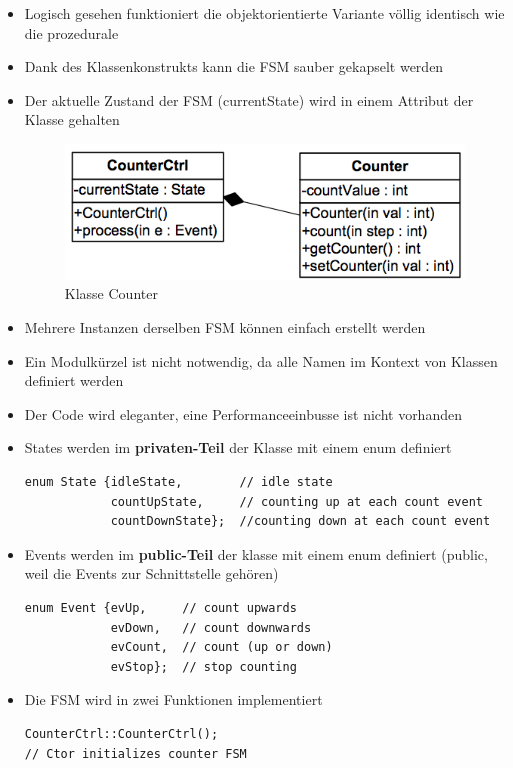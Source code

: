 \begin{itemize}
  \item Logisch gesehen funktioniert die objektorientierte Variante völlig
  identisch wie die prozedurale
  \item Dank des Klassenkonstrukts kann die FSM sauber gekapselt werden
  \item Der aktuelle Zustand der FSM (currentState) wird in einem Attribut der
  Klasse gehalten
  \begin{figure}[h]
    \centering
    {\includegraphics[scale = 0.5]{images/FSM/klasseCounter}  
    \caption{Klasse Counter}
    \label{fig:klasseCounter}}
  \end{figure}
  \item Mehrere Instanzen derselben FSM können einfach erstellt werden
  \item Ein Modulkürzel ist nicht notwendig, da alle Namen im Kontext von
  Klassen definiert werden
  \item Der Code wird eleganter, eine Performanceeinbusse ist nicht vorhanden
  \item States werden im \textbf{privaten-Teil} der Klasse mit einem enum
  definiert
\begin{lstlisting}[style=Cpp]
enum State {idleState,        // idle state 
            countUpState,     // counting up at each count event 
            countDownState};  //counting down at each count event
\end{lstlisting}
\item Events werden im \textbf{public-Teil} der klasse mit einem enum definiert
(public, weil die Events zur Schnittstelle gehören)
\begin{lstlisting}[style=Cpp]
enum Event {evUp,     // count upwards
            evDown,   // count downwards 
            evCount,  // count (up or down)
            evStop};  // stop counting
\end{lstlisting}
\item Die FSM wird in zwei Funktionen implementiert
\begin{lstlisting}[style=Cpp]
CounterCtrl::CounterCtrl(); 
// Ctor initializes counter FSM


\end{lstlisting}
\end{itemize}
